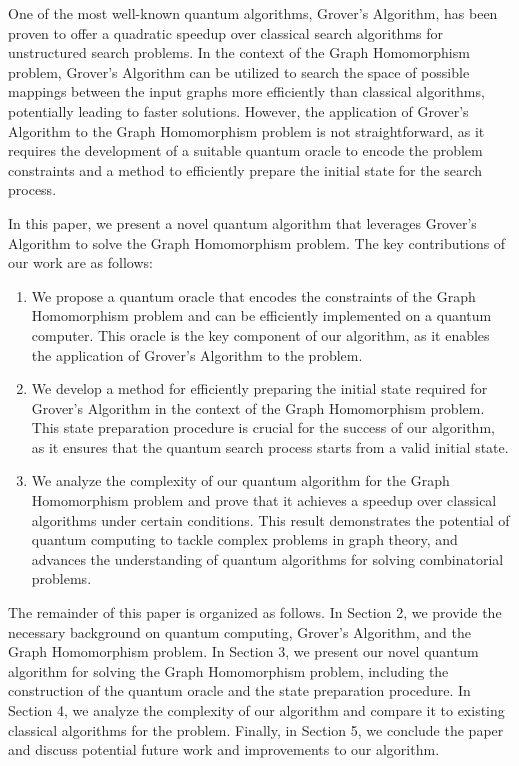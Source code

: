 One of the most well-known quantum algorithms, Grover's Algorithm, has been proven to offer a quadratic speedup over classical search algorithms for unstructured search problems. In the context of the Graph Homomorphism problem, Grover's Algorithm can be utilized to search the space of possible mappings between the input graphs more efficiently than classical algorithms, potentially leading to faster solutions. However, the application of Grover's Algorithm to the Graph Homomorphism problem is not straightforward, as it requires the development of a suitable quantum oracle to encode the problem constraints and a method to efficiently prepare the initial state for the search process.

In this paper, we present a novel quantum algorithm that leverages Grover's Algorithm to solve the Graph Homomorphism problem. The key contributions of our work are as follows:

\begin{enumerate}
    \item We propose a quantum oracle that encodes the constraints of the Graph Homomorphism problem and can be efficiently implemented on a quantum computer. This oracle is the key component of our algorithm, as it enables the application of Grover's Algorithm to the problem.
    
    \item We develop a method for efficiently preparing the initial state required for Grover's Algorithm in the context of the Graph Homomorphism problem. This state preparation procedure is crucial for the success of our algorithm, as it ensures that the quantum search process starts from a valid initial state.
    
    \item We analyze the complexity of our quantum algorithm for the Graph Homomorphism problem and prove that it achieves a speedup over classical algorithms under certain conditions. This result demonstrates the potential of quantum computing to tackle complex problems in graph theory, and advances the understanding of quantum algorithms for solving combinatorial problems.
\end{enumerate}

The remainder of this paper is organized as follows. In Section 2, we provide the necessary background on quantum computing, Grover's Algorithm, and the Graph Homomorphism problem. In Section 3, we present our novel quantum algorithm for solving the Graph Homomorphism problem, including the construction of the quantum oracle and the state preparation procedure. In Section 4, we analyze the complexity of our algorithm and compare it to existing classical algorithms for the problem. Finally, in Section 5, we conclude the paper and discuss potential future work and improvements to our algorithm.

